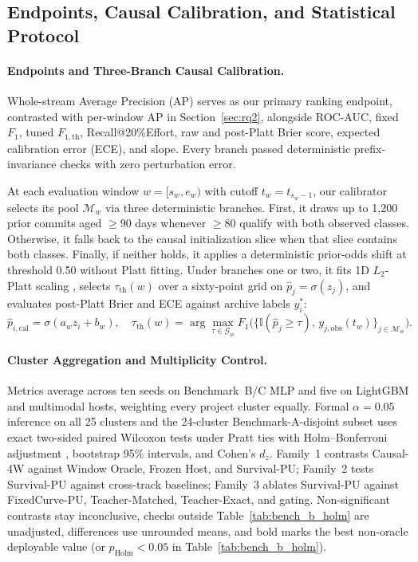 \documentclass[pdflatex,sn-basic]{sn-jnl}
\theoremstyle{definition}
\theoremstyle{plain}
\begin{document}
\subsection{Endpoints, Causal Calibration, and Statistical Protocol}
\label{sec:metrics_protocol}

\paragraph{Endpoints and Three-Branch Causal Calibration.}
Whole-stream Average Precision (AP) serves as our primary ranking endpoint, contrasted with per-window AP in Section~\ref{sec:rq2}, alongside ROC-AUC, fixed $F_1$, tuned $F_{1,\text{th}}$, Recall@20\%Effort, raw and post-Platt Brier score, expected calibration error (ECE), and slope. Every branch passed deterministic prefix-invariance checks with zero perturbation error.

At each evaluation window $w = [s_w, e_w)$ with cutoff $t_w = t_{s_w - 1}$, our calibrator selects its pool $\mathcal{M}_w$ via three deterministic branches. First, it draws up to 1,200 prior commits aged $\ge 90$ days whenever $\ge 80$ qualify with both observed classes. Otherwise, it falls back to the causal initialization slice when that slice contains both classes. Finally, if neither holds, it applies a deterministic prior-odds shift at threshold 0.50 without Platt fitting. Under branches one or two, it fits 1D $L_2$-Platt scaling \citep{platt1999probabilistic}, selects $\tau_{\text{th}}(w)$ over a sixty-point grid on $\hat{p}_j = \sigma(z_j)$, and evaluates post-Platt Brier and ECE against archive labels $y_i^*$:
{\small\begin{equation}
  \hat{p}_{i,\text{cal}} = \sigma(a_w z_i + b_w), \quad
  \tau_{\text{th}}(w) = \textstyle\arg\max_{\tau \in \mathcal{G}_w} F_1\!\big(\{\mathbb{I}(\hat{p}_j \ge \tau),\, y_{j,\text{obs}}(t_w)\}_{j \in \mathcal{M}_w}\big).
  \label{eq:causal_cal}
\end{equation}}

\paragraph{Cluster Aggregation and Multiplicity Control.}
Metrics average across ten seeds on Benchmark~B/C MLP and five on LightGBM and multimodal hosts, weighting every project cluster equally. Formal $\alpha = 0.05$ inference on all 25 clusters and the 24-cluster Benchmark-A-disjoint subset uses exact two-sided paired Wilcoxon tests under Pratt ties with Holm--Bonferroni adjustment \citep{holm1979simple}, bootstrap 95\% intervals, and Cohen's $d_z$. Family~1 contrasts Causal-4W against Window Oracle, Frozen Host, and Survival-PU; Family~2 tests Survival-PU against cross-track baselines; Family~3 ablates Survival-PU against FixedCurve-PU, Teacher-Matched, Teacher-Exact, and gating. Non-significant contrasts stay inconclusive, checks outside Table~\ref{tab:bench_b_holm} are unadjusted, differences use unrounded means, and bold marks the best non-oracle deployable value (or $p_{\text{Holm}} < 0.05$ in Table~\ref{tab:bench_b_holm}).
\end{document}
